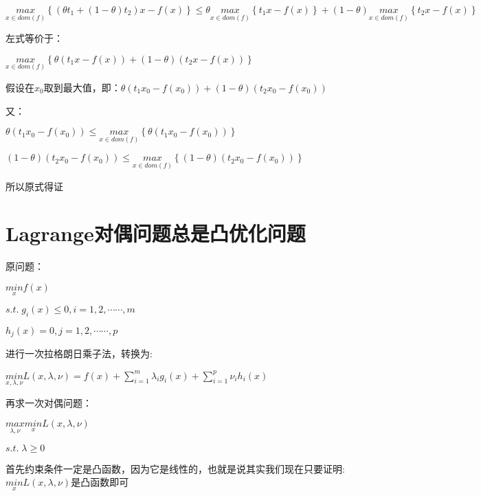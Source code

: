 \documentclass[12pt, a4paper, oneside, fontset=windows]{ctexart}
\begin{document}
$\underset{x \in  dom\left ( f \right )}{max}\left \{\left ( \theta t_{1}+\left ( 1-\theta  \right )t_{2} \right )x-f\left ( x \right )  \right \}\leq \theta \underset{x \in  dom\left ( f \right )}{max}\left \{t_{1} x-f\left ( x \right )  \right \} +\left ( 1-\theta  \right ) \underset{x \in  dom\left ( f \right )}{max}\left \{t_{2} x-f\left ( x \right )  \right \}$

左式等价于：

$\underset{x \in  dom\left ( f \right )}{max}\left \{ \theta \left ( t_{1}x-f\left ( x \right ) \right )+\left ( 1-\theta  \right ) \left ( t_{2}x-f\left ( x \right ) \right ) \right \}$

假设在$x_{0}$取到最大值，即：$\theta \left ( t_{1}x_{0}-f\left ( x_{0} \right ) \right )+\left ( 1-\theta  \right ) \left ( t_{2}x_{0}-f\left ( x_{0} \right ) \right ) $

又：

$\theta \left ( t_{1}x_{0}-f\left ( x_{0} \right ) \right )\leq  \underset{x \in  dom\left ( f \right )}{max}\left \{ \theta \left ( t_{1}x_{0}-f\left ( x_{0} \right ) \right ) \right \} $

$\left ( 1-\theta  \right ) \left ( t_{2}x_{0}-f\left ( x_{0} \right ) \right )\leq  \underset{x \in  dom\left ( f \right )}{max}\left \{ \left ( 1-\theta  \right )  \left ( t_{2}x_{0}-f\left ( x_{0} \right ) \right ) \right \} $

所以原式得证

\section{Lagrange对偶问题总是凸优化问题}
原问题：

$\underset{x}{min}f\left ( x \right )$

$s.t.\; g_{i}\left ( x \right )\leq 0,i=1,2,\cdots \cdots ,m$

$h_{j}\left ( x \right )=0,j=1,2,\cdots \cdots ,p$

进行一次拉格朗日乘子法，转换为:

$\underset{x,\lambda ,\nu }{min}L\left ( x,\lambda ,\nu  \right )=f\left ( x \right )+\sum_{i=1}^{m}\lambda _{i}g_{i}\left ( x \right )+\sum_{i=1}^{p}\nu  _{i}h_{i}\left ( x \right )$

再求一次对偶问题：

$\underset{\lambda ,\nu }{max}\underset{x }{min}L\left ( x,\lambda ,\nu  \right )$

$s.t.\; \lambda \geq 0$

首先约束条件一定是凸函数，因为它是线性的，也就是说其实我们现在只要证明:$\underset{x }{min}L\left ( x,\lambda ,\nu  \right )$是凸函数即可
\end{document}
